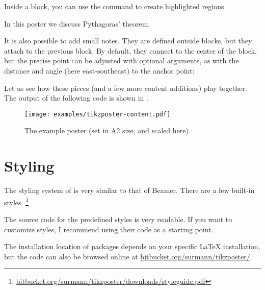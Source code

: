 Inside a block, you can use the  command to create highlighted regions.
%
\begin{ExampleCode}
{
In this poster we discuss Pythagoras' theorem.


}
\end{ExampleCode}
%
It is also possible to add small notes.
They are defined outside blocks, but they attach to the previous block.
By default, they connect to the center of the block,
but the precise point can be adjusted with optional arguments,
as with the distance and angle (here east-southeast) to the anchor point:
%
\begin{ExampleCode}
\end{ExampleCode}

Let us see how these pieces (and a few more content additions) play together.
The output of the following code is shown in .

\begin{figure}
\centering
\texttt{[image: examples/tikzposter-content.pdf]}
\caption{The example poster (set in A2 size, and scaled here).}\label{fig:poster example}
\end{figure}





%
%
\section{Styling}\label{sec:poster style}

The styling system of  is very similar to that of Beamer.
There are a few built-in styles.%
\footnote{\url{bitbucket.org/surmann/tikzposter/downloads/styleguide.pdf}}


\begin{technote}
The source code for the predefined styles is very readable.
If you want to customize styles, I recommend using their code as a starting point.

The installation location of packages depends on your specific \LaTeX{} installation,
but the code can also be browsed online at \url{bitbucket.org/surmann/tikzposter/}.
\end{technote}


